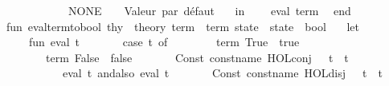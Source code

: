 \begin{isabellebody}
\ \ \ \ \ \ \ \ \ \ {\isacharbar}{\kern0pt}\ NONE\ {\isacharequal}{\kern0pt}{\isachargreater}{\kern0pt}\ {}{\isacharparenright}{\kern0pt}\ {\isacharparenleft}{\kern0pt}{\isacharasterisk}{\kern0pt}\ Valeur\ par\ défaut\ {\isacharasterisk}{\kern0pt}{\isacharparenright}{\kern0pt}\isanewline
\ \ in\isanewline
\ \ \ \ eval\ term\isanewline
\ \ end\isanewline
\isanewline
fun\ eval{\isacharunderscore}{\kern0pt}term{\isacharunderscore}{\kern0pt}to{\isacharunderscore}{\kern0pt}bool\ {\isacharparenleft}{\kern0pt}thy\ {\isacharcolon}{\kern0pt}\ theory{\isacharparenright}{\kern0pt}\ {\isacharparenleft}{\kern0pt}term\ {\isacharcolon}{\kern0pt}\ term{\isacharparenright}{\kern0pt}\ {\isacharparenleft}{\kern0pt}state\ {\isacharcolon}{\kern0pt}\ state{\isacharparenright}{\kern0pt}\ {\isacharcolon}{\kern0pt}\ bool\ {\isacharequal}{\kern0pt}\isanewline
\ \ let\isanewline
\ \ \ \ fun\ eval\ t\ {\isacharequal}{\kern0pt}\isanewline
\ \ \ \ \ \ case\ t\ of\isanewline
\ \ \ \ \ \ \ \ {\isacharat}{\kern0pt}{\isacharbraceleft}{\kern0pt}term\ {\isachardoublequote}{\kern0pt}True{\isachardoublequote}{\kern0pt}{\isacharbraceright}{\kern0pt}\ {\isacharequal}{\kern0pt}{\isachargreater}{\kern0pt}\ true\isanewline
\ \ \ \ \ \ {\isacharbar}{\kern0pt}\ {\isacharat}{\kern0pt}{\isacharbraceleft}{\kern0pt}term\ {\isachardoublequote}{\kern0pt}False{\isachardoublequote}{\kern0pt}{\isacharbraceright}{\kern0pt}\ {\isacharequal}{\kern0pt}{\isachargreater}{\kern0pt}\ false\isanewline
\ \ \ \ \ \ {\isacharbar}{\kern0pt}\ Const\ {\isacharparenleft}{\kern0pt}{\isacharat}{\kern0pt}{\isacharbraceleft}{\kern0pt}const{\isacharunderscore}{\kern0pt}name\ {\isachardoublequote}{\kern0pt}HOL{\isachardot}{\kern0pt}conj{\isachardoublequote}{\kern0pt}{\isacharbraceright}{\kern0pt}{\isacharcomma}{\kern0pt}\ {\isacharunderscore}{\kern0pt}{\isacharparenright}{\kern0pt}\ {\isachardollar}{\kern0pt}\ t{}\ {\isachardollar}{\kern0pt}\ t{}\ {\isacharequal}{\kern0pt}{\isachargreater}{\kern0pt}\isanewline
\ \ \ \ \ \ \ \ \ \ {\isacharparenleft}{\kern0pt}eval\ t{}{\isacharparenright}{\kern0pt}\ andalso\ {\isacharparenleft}{\kern0pt}eval\ t{}{\isacharparenright}{\kern0pt}\isanewline
\ \ \ \ \ \ {\isacharbar}{\kern0pt}\ Const\ {\isacharparenleft}{\kern0pt}{\isacharat}{\kern0pt}{\isacharbraceleft}{\kern0pt}const{\isacharunderscore}{\kern0pt}name\ {\isachardoublequote}{\kern0pt}HOL{\isachardot}{\kern0pt}disj{\isachardoublequote}{\kern0pt}{\isacharbraceright}{\kern0pt}{\isacharcomma}{\kern0pt}\ {\isacharunderscore}{\kern0pt}{\isacharparenright}{\kern0pt}\ {\isachardollar}{\kern0pt}\ t{}\ {\isachardollar}{\kern0pt}\ t{}\ {\isacharequal}{\kern0pt}{\isachargreater}{\kern0pt}\isanewline

\end{isabellebody}
